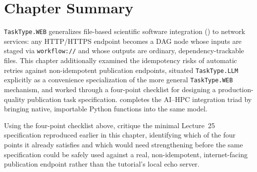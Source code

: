 \section{Chapter Summary}

\texttt{TaskType.WEB} generalizes file-based scientific software integration
() to network services: any HTTP/HTTPS endpoint
becomes a DAG node whose inputs are staged via \texttt{workflow://} and whose
outputs are ordinary, dependency-trackable files. This chapter additionally
examined the idempotency risks of automatic retries against non-idempotent
publication endpoints, situated \texttt{TaskType.LLM} explicitly as a
convenience specialization of the more general \texttt{TaskType.WEB}
mechanism, and worked through a four-point checklist for designing a
production-quality publication task specification. 
completes the AI--HPC integration triad by bringing native, importable
Python functions into the same model.

\begin{exercise}
Using the four-point checklist above, critique the minimal Lecture~25
specification reproduced earlier in this chapter, identifying which of the
four points it already satisfies and which would need strengthening before
the same specification could be safely used against a real, non-idempotent,
internet-facing publication endpoint rather than the tutorial's local echo
server.
\end{exercise}
